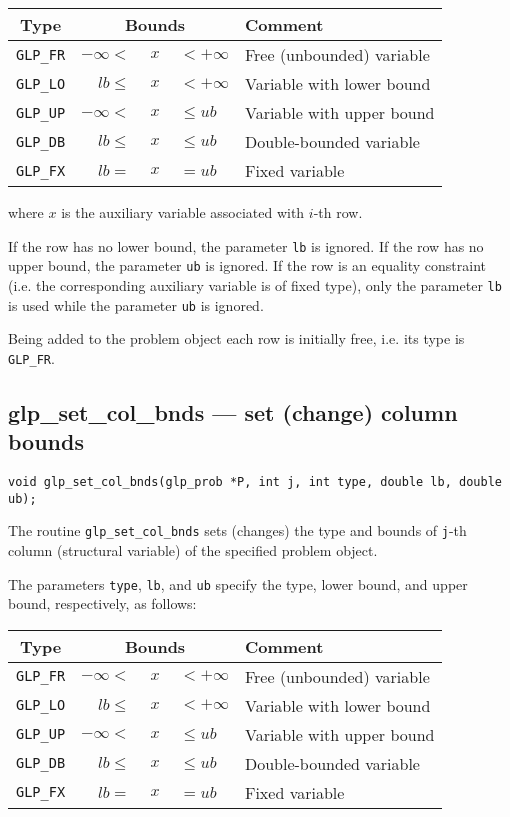 \begin{center}
\begin{tabular}{cr@{}c@{}ll}
Type & \multicolumn{3}{c}{Bounds} & Comment \\
\hline
\verb|GLP_FR| & $-\infty <$ &$\ x\ $& $< +\infty$
   & Free (unbounded) variable \\
\verb|GLP_LO| & $lb \leq$ &$\ x\ $& $< +\infty$
   & Variable with lower bound \\
\verb|GLP_UP| & $-\infty <$ &$\ x\ $& $\leq ub$
   & Variable with upper bound \\
\verb|GLP_DB| & $lb \leq$ &$\ x\ $& $\leq ub$
   & Double-bounded variable \\
\verb|GLP_FX| & $lb =$ &$\ x\ $& $= ub$
   & Fixed variable \\
\end{tabular}
\end{center}

\noindent
where $x$ is the auxiliary variable associated with $i$-th row.

If the row has no lower bound, the parameter \verb|lb| is ignored. If
the row has no upper bound, the parameter \verb|ub| is ignored. If the
row is an equality constraint (i.e. the corresponding auxiliary
variable is of fixed type), only the parameter \verb|lb| is used while
the parameter \verb|ub| is ignored.

Being added to the problem object each row is initially free, i.e. its
type is \verb|GLP_FR|.

\subsection{glp\_set\_col\_bnds --- set (change) column bounds}

\synopsis

{\tt void glp\_set\_col\_bnds(glp\_prob *P, int j, int type,
double lb, double ub);}

\description

The routine \verb|glp_set_col_bnds| sets (changes) the type and bounds
of \verb|j|-th column (structural variable) of the specified problem
object.

The parameters \verb|type|, \verb|lb|, and \verb|ub| specify the type,
lower bound, and upper bound, respectively, as follows:

\begin{center}
\begin{tabular}{cr@{}c@{}ll}
Type & \multicolumn{3}{c}{Bounds} & Comment \\
\hline
\verb|GLP_FR| & $-\infty <$ &$\ x\ $& $< +\infty$
   & Free (unbounded) variable \\
\verb|GLP_LO| & $lb \leq$ &$\ x\ $& $< +\infty$
   & Variable with lower bound \\
\verb|GLP_UP| & $-\infty <$ &$\ x\ $& $\leq ub$
   & Variable with upper bound \\
\verb|GLP_DB| & $lb \leq$ &$\ x\ $& $\leq ub$
   & Double-bounded variable \\
\verb|GLP_FX| & $lb =$ &$\ x\ $& $= ub$
   & Fixed variable \\
\end{tabular}
\end{center}

